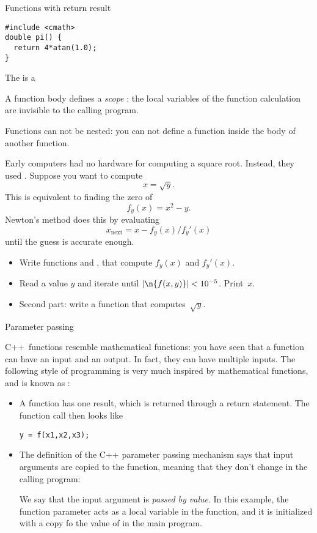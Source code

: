 \begin{block}{Functions with return result}
  \label{sl:func-return}
\begin{verbatim}
#include <cmath>
double pi() {
  return 4*atan(1.0);
}
\end{verbatim}
The  is a 
\end{block}

A function body defines a
%
\emph{scope}%
:
the local variables of the function calculation are invisible to the
calling program.

Functions can not be nested: you can not define a function inside the
body of another function.

\begin{exercise}
  \label{ex:newton-root}
  Early computers had no hardware for computing a square
  root. Instead, they used . Suppose you
  want to compute \[ x=\sqrt{y}. \] This is equivalent to finding the
  zero of \[ f_y(x) = x^2-y. \]
  Newton's method does this by evaluating \[ x_{\mathrm{next}}=x-f_y(x)/f_y'(x) \]
  until the guess is accurate enough.
  \begin{itemize}
  \item Write functions  and , that compute
    $f_y(x)$ and $f_y'(x)$.
  \item Read a value $y$ and iterate until $|\n{f(x,y)}|<10^{-5}$. Print~$x$.
  \item Second part: write a function  that computes~$\sqrt{y}$.
  \end{itemize}
\end{exercise}

 {Parameter passing}
\label{sec:passing}

C++~functions resemble mathematical functions:
you have seen that a function can have an input and an
output. In fact, they can have multiple inputs.
The following style of programming is very much inspired by
mathematical functions, and is known as :
\begin{itemize}
\item A function has one result, which is returned through a return
  statement. The function call then looks like
\begin{verbatim}
y = f(x1,x2,x3);
\end{verbatim}
\item The definition of the C++ parameter passing mechanism says that
  input arguments are copied to the function, meaning that they don't
  change in the calling program:

  We say that the input argument is
  \emph{passed by value}.
  In this example, the function parameter  acts as a local
  variable in the function, and it is initialized with a copy fo the
  value of  in the main program.
\end{itemize}

